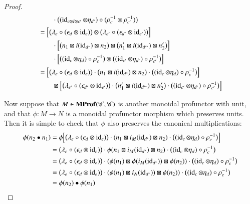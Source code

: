 \documentclass[12pt,oneside,article,draft]{memoir}
\begin{document}
\begin{enumerate}
\begin{proof}
\begin{align*}
		&\qquad \cdot\bigl((\operatorname{id}_{c\otimes I\otimes c'}\otimes\eta_{d'})\circ(\rho_c^{-1}\otimes\rho_{c'}^{-1})\bigr) \\
		&= \Bigl[\bigl(\lambda_e\circ(\epsilon_d\otimes\operatorname{id}_e)\bigr)\otimes\bigl(\lambda_{e'}\circ(\epsilon_{d'}\otimes\operatorname{id}_{e'})\bigr)\Bigr] \\
		&\qquad \cdot\Bigl[\bigl(n_1\boxtimes i(\operatorname{id}_{d^*})\boxtimes n_2\bigr)\boxtimes\bigl(n'_1\boxtimes i(\operatorname{id}_{d'^*})\boxtimes n'_2\bigr)\Bigr] \\
		&\qquad \cdot\Bigl[\bigl((\operatorname{id}_c\otimes\eta_d)\circ\rho_c^{-1}\bigr)\otimes\bigl((\operatorname{id}_{c'}\otimes\eta_{d'})\circ\rho_{c'}^{-1}\bigr)\Bigr] \\
		&= \Bigl[\bigl(\lambda_e\circ(\epsilon_d\otimes\operatorname{id}_e)\bigr)\cdot\bigl(n_1\boxtimes i(\operatorname{id}_{d^*})\boxtimes n_2\bigr)\cdot\bigl((\operatorname{id}_c\otimes\eta_d)\circ\rho_c^{-1}\bigr)\Bigr] \\
		&\qquad \boxtimes\Bigl[\bigl(\lambda_{e'}\circ(\epsilon_{d'}\otimes\operatorname{id}_{e'})\bigr)\cdot\bigl(n'_1\boxtimes i(\operatorname{id}_{d'^*})\boxtimes n'_2\bigr)\cdot\bigl((\operatorname{id}_{c'}\otimes\eta_{d'})\circ\rho_{c'}^{-1}\bigr)\Bigr]
	\end{align*}

	Now suppose that $M\in\mathbf{MProf}(\mathscr{C},\mathscr{C})$ is another monoidal profunctor with unit, and that $\phi\colon M\to N$ is a monoidal profunctor morphism which preserves units.
	Then it is simple to check that $\phi$ also preserves the canonical multiplications:
	\begin{align*}
		\phi(n_2\bullet n_1) &= \phi\Bigl[\bigl(\lambda_e\circ(\epsilon_d\otimes\operatorname{id}_e)\bigr)\cdot(n_1\boxtimes i_M(\operatorname{id}_{d^*})\boxtimes n_2)\cdot\bigl((\operatorname{id}_c\otimes \eta_d)\circ\rho_c^{-1}\bigr)\Bigr] \\
		&= \bigl(\lambda_e\circ(\epsilon_d\otimes\operatorname{id}_e)\bigr)\cdot\phi(n_1\boxtimes i_M(\operatorname{id}_{d^*})\boxtimes n_2)\cdot\bigl((\operatorname{id}_c\otimes \eta_d)\circ\rho_c^{-1}\bigr) \\
		&= \bigl(\lambda_e\circ(\epsilon_d\otimes\operatorname{id}_e)\bigr)\cdot(\phi(n_1)\boxtimes \phi(i_M(\operatorname{id}_{d^*}))\boxtimes \phi(n_2))\cdot\bigl((\operatorname{id}_c\otimes \eta_d)\circ\rho_c^{-1}\bigr) \\
		&= \bigl(\lambda_e\circ(\epsilon_d\otimes\operatorname{id}_e)\bigr)\cdot(\phi(n_1)\boxtimes i_N(\operatorname{id}_{d^*}))\boxtimes \phi(n_2))\cdot\bigl((\operatorname{id}_c\otimes \eta_d)\circ\rho_c^{-1}\bigr) \\
		&= \phi(n_2)\bullet\phi(n_1)
	\end{align*}
\end{proof}


\end{enumerate}
\end{document}
